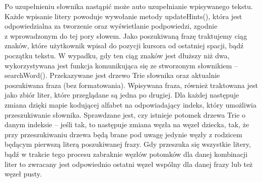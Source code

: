 \documentclass[twoside,a4paper]{book}
\begin{document}
Po uzupełnieniu słownika nastąpić może auto uzupełnianie wpisywanego tekstu.
Każde wpisanie litery powoduje wywołanie metody updateHints(), która jest odpowiedzialna za tworzenie oraz wyświetlanie podpowiedzi, zgodnie \\z wprowadzonym do tej pory słowem. Jako poszukiwaną frazę traktujemy ciąg znaków, które użytkownik wpisał do pozycji kursora od ostatniej spacji, bądź początku tekstu. W wypadku, gdy ten ciąg znaków jest dłuższy niż dwa, wykorzystywana jest funkcja komunikująca się ze stworzonym słownikiem – searchWord(). Przekazywane jest drzewo Trie słownika oraz aktualnie poszukiwana fraza (bez formatowania). 
Wpisywana fraza, również traktowana jest jako zbiór liter, które przeglądane są jedna po drugiej. Dla każdej następuje zmiana dzięki mapie kodującej alfabet na odpowiadający indeks, który umożliwia przeszukiwanie słownika. Sprawdzane jest, czy istnieje potomek drzewa Trie o danym indeksie – jeśli tak, to następuje zmiana węzła na węzeł dziecka, tak, że przy przeszukiwaniu drzewa będą brane pod uwagę jedynie węzły z rodzicem będącym pierwszą literą poszukiwanej frazy. Gdy przeszuka się wszystkie litery, bądź w trakcie tego procesu zabraknie węzłów potomków dla danej kombinacji liter to zwracany jest odpowiednio ostatni węzeł wspólny dla danej frazy lub też węzeł pusty. 
\end{document}
